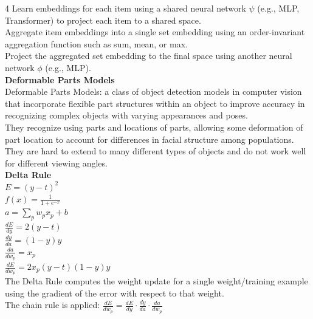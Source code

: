 \documentclass[8pt]{extarticle}
\begin{document}
\begin{multicols}{4}
Learn embeddings for each item using a shared neural network $\psi$ (e.g., MLP, Transformer) to project each item to a shared space.\\
Aggregate item embeddings into a single set embedding using an order-invariant aggregation function such as sum, mean, or max.\\
Project the aggregated set embedding to the final space using another neural network $\phi$ (e.g., MLP).\\
\vspace{2pt}\textbf{Deformable Parts Models}\\
Deformable Parts Models: a class of object detection models in computer vision that incorporate flexible part structures within an object to improve accuracy in recognizing complex objects with varying appearances and poses.\\
They recognize using parts and locations of parts, allowing some deformation of part location to account for differences in facial structure among populations.\\
They are hard to extend to many different types of objects and do not work well for different viewing angles.\\
\vspace{2pt}\textbf{Delta Rule}\\
$E = (y - t)^2$\\
$f(x) = \frac{1}{1 + e^{-x}}$\\
$a = \sum_{p} w_{p} x_{p} + b$\\
$\frac{dE}{dy} = 2 (y - t)$\\
$\frac{dy}{da} = (1 - y) y$\\
$\frac{da}{dw_{p}} = x_{p}$\\
$\frac{dE}{dw_{p}} = 2 x_{p} (y - t) (1 - y) y$\\
The Delta Rule computes the weight update for a single weight/training example using the gradient of the error with respect to that weight.\\
The chain rule is applied: $\frac{dE}{dw_{p}} = \frac{dE}{dy}\cdot\frac{dy}{da}\cdot\frac{da}{dw_{p}}$\\


\end{multicols}
\end{document}
